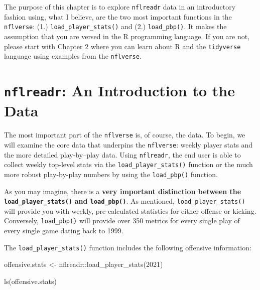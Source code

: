 \documentclass[
  letterpaper,
]{krantz}
\newenvironment{Shaded}{\begin{snugshade}}{\end{snugshade}}
\newcommand{\DecValTok}[1]{\textcolor[rgb]{0.68,0.00,0.00}{#1}}
\newcommand{\FunctionTok}[1]{\textcolor[rgb]{0.28,0.35,0.67}{#1}}
\newcommand{\NormalTok}[1]{\textcolor[rgb]{0.00,0.23,0.31}{#1}}
\newcommand{\OtherTok}[1]{\textcolor[rgb]{0.00,0.23,0.31}{#1}}
\newcommand{\SpecialCharTok}[1]{\textcolor[rgb]{0.37,0.37,0.37}{#1}}
\begin{document}
The purpose of this chapter is to explore \texttt{nflreadr} data in an
introductory fashion using, what I believe, are the two most important
functions in the \texttt{nflverse}: (1.) \texttt{load\_player\_stats()}
and (2.) \texttt{load\_pbp()}. It makes the assumption that you are
versed in the R programming language. If you are not, please start with
Chapter 2 where you can learn about R and the \texttt{tidyverse}
language using examples from the \texttt{nflverse}.

\hypertarget{nflreadr-an-introduction-to-the-data}{%
\section{\texorpdfstring{\texttt{nflreadr}: An Introduction to the
Data}{nflreadr: An Introduction to the Data}}\label{nflreadr-an-introduction-to-the-data}}

The most important part of the \texttt{nflverse} is, of course, the
data. To begin, we will examine the core data that underpins the
\texttt{nflverse}: weekly player stats and the more detailed
play-by--play data. Using \texttt{nflreadr}, the end user is able to
collect weekly top-level stats via the \texttt{load\_player\_stats()}
function or the much more robust play-by-play numbers by using the
\texttt{load\_pbp()} function.

As you may imagine, there is a \textbf{very important distinction
between the \texttt{load\_player\_stats()}} \textbf{and
\texttt{load\_pbp()}}. As mentioned, \texttt{load\_player\_stats()} will
provide you with weekly, pre-calculated statistics for either offense or
kicking. Conversely, \texttt{load\_pbp()} will provide over 350 metrics
for every single play of every single game dating back to 1999.

The \texttt{load\_player\_stats()} function includes the following
offensive information:

\begin{Shaded}
\begin{Highlighting}[]
\NormalTok{offensive.stats }\OtherTok{\textless{}{-}}\NormalTok{ nflreadr}\SpecialCharTok{::}\FunctionTok{load\_player\_stats}\NormalTok{(}\DecValTok{2021}\NormalTok{)}

\FunctionTok{ls}\NormalTok{(offensive.stats)}
\end{Highlighting}
\end{Shaded}
\end{document}
